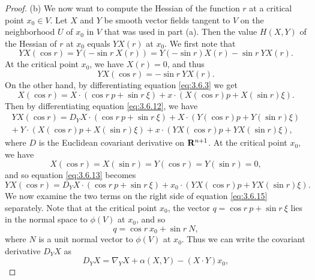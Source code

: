 \documentclass[10pt,a4paper]{amsart}
\begin{document}
\begin{proof}
\noindent 
(b) We now want to compute the 
Hessian of the function $r$ at a critical point $x_0 \in V$.  Let $X$ and $Y$ be
smooth vector fields tangent to $V$ on the neighborhood $U$ of $x_0$ in $V$ that was used in part (a).  
Then the value $H(X,Y)$ of 
the Hessian of $r$
at $x_0$ equals $YX(r)$ at $x_0$.  We first note that
\begin{equation}
\label{eq:3.6.10}
YX(\cos r) = Y(-\sin r \ X(r)) = Y(-\sin r) X(r) - \sin r \ YX(r).
\end{equation}
At the critical point $x_0$, we have $X(r) = 0$, and thus
\begin{equation}
\label{eq:3.6.11}
YX(\cos r) = - \sin r \ YX(r).
\end{equation}
On the other hand, by differentiating equation \eqref{eq:3.6.3} we get
\begin{equation}
\label{eq:3.6.12}
X(\cos r) = X \cdot (\cos r\  p + \sin r\  \xi) + x \cdot (X(\cos r) p + X(\sin r) \xi).
\end{equation}
Then by differentiating equation \eqref{eq:3.6.12}, we have
\begin{eqnarray}
\label{eq:3.6.13}
YX(\cos r) = D_Y X \cdot (\cos r\  p + \sin r\  \xi) + X \cdot (Y(\cos r) p + Y(\sin r) \xi) \\ 
 + \ Y \cdot (X(\cos r) p + X(\sin r) \xi) + x \cdot (YX(\cos r) p + YX(\sin r) \xi), \nonumber
\end{eqnarray}
where $D$ is the Euclidean covariant derivative on ${\bf R}^{n+1}$.  At the critical point $x_0$, we have
\begin{equation}
\label{eq:3.6.14}
X(\cos r) = X(\sin r) = Y(\cos r) = Y(\sin r) = 0,
\end{equation}
and so equation \eqref{eq:3.6.13} becomes
\begin{equation}
\label{eq:3.6.15}
YX(\cos r) = D_Y X \cdot (\cos r\  p + \sin r\  \xi) + x_0 \cdot (YX(\cos r) p + YX(\sin r) \xi).
\end{equation}
We now examine the two terms on the right side of equation \eqref{eq:3.6.15} separately.  Note that at the critical point
$x_0$, the vector $q = \cos r \ p + \sin r \ \xi$ lies in the normal
space to $\phi (V)$ at $x_0$, and so
\begin{equation}
\label{eq:3.6.16}
q = \cos r\  x_0 + \sin r\  N, 
\end{equation}
where $N$ is a unit normal vector to $\phi (V)$ at $x_0$.  Thus we can write the covariant derivative
$D_Y X$ as
\begin{equation}
\label{eq:3.6.17}
D_Y X = \nabla_Y X + \alpha (X,Y) - (X \cdot Y) x_0, 

\end{equation}
\end{proof}
\end{document}
